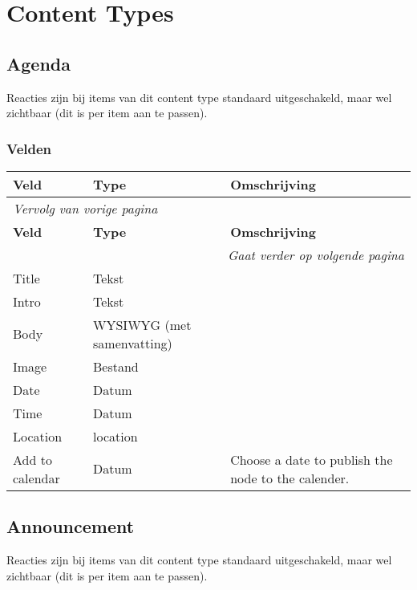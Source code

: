 \section{Content Types}
\subsection{Agenda}
\label{sec:content-agenda}
Reacties zijn bij items van dit content type standaard uitgeschakeld, maar wel zichtbaar (dit is per item aan te passen).

\subsubsection{Velden}
  \begin{longtable}{| p{3.75cm}|p{3.75cm}|p{7.50cm}|}
  \hline
  \rowcolor{tableheader}
  \textbf{Veld} & \textbf{Type} & \textbf{Omschrijving}  \tabularnewline
  \hline
\endfirsthead
\multicolumn{3}{l}{\textit{Vervolg van vorige pagina}} \\
\hline
\rowcolor{tableheader}
  \textbf{Veld} & \textbf{Type} & \textbf{Omschrijving}  \tabularnewline
  \hline
\hline
\endhead
\multicolumn{3}{r}{\textit{Gaat verder op volgende pagina}} \\
\endfoot
\hline
\endlastfoot
  \raggedright{Title} & \raggedright{Tekst} & \raggedright{}  \tabularnewline
  \hline
  \raggedright{Intro} & \raggedright{Tekst} & \raggedright{}  \tabularnewline
  \hline
  \raggedright{Body} & \raggedright{WYSIWYG (met samenvatting)} & \raggedright{}  \tabularnewline
  \hline
  \raggedright{Image} & \raggedright{Bestand} & \raggedright{}  \tabularnewline
  \hline
  \raggedright{Date} & \raggedright{Datum} & \raggedright{}  \tabularnewline
  \hline
  \raggedright{Time} & \raggedright{Datum} & \raggedright{}  \tabularnewline
  \hline
  \raggedright{Location} & \raggedright{location} & \raggedright{}  \tabularnewline
  \hline
  \raggedright{Add to calendar} & \raggedright{Datum} & \raggedright{Choose a date to publish the node to the calender.}  \tabularnewline
  \hline
  \end{longtable}

\subsection{Announcement}
\label{sec:content-announcement}
Reacties zijn bij items van dit content type standaard uitgeschakeld, maar wel zichtbaar (dit is per item aan te passen).

